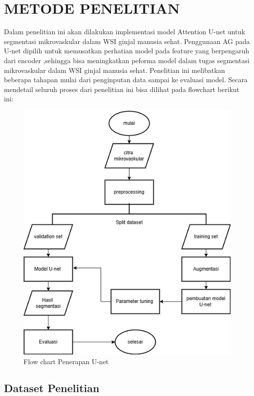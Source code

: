 \chapter{METODE PENELITIAN}

\noindent Dalam penelitian ini akan dilakukan implementasi model Attention U-net untuk segmentasi mikrovaskular dalam WSI ginjal manusia sehat.  Penggunaan AG pada U-net dipilih untuk memusatkan perhatian model pada feature yang berpengaruh dari encoder ,sehingga bisa meningkatkan peforma model dalam tugas segmentasi mikrovaskular dalam WSI ginjal manusia sehat. Penelitian ini melibatkan beberapa tahapan mulai dari penginputan data sampai ke evaluasi model. Secara mendetail seluruh proses dari penelitian ini bisa dilihat pada flowchart berikut ini:
\begin{figure}[H]
	\centering
	\includegraphics[scale=.6]{gambar/flow-chart.png}
	\caption{Flow chart Penerapan U-net}
	\label{fig:flow-chart}
\end{figure}

\section{Dataset Penelitian}

